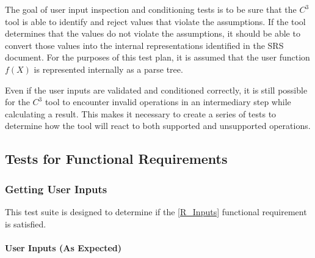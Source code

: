 \documentclass[12pt, titlepage]{article}
\newcommand{\prognameAbbrv}{$C^{3}$}
\begin{document}
The goal of user input inspection and conditioning tests is to be sure that the 
\prognameAbbrv{} tool is able to identify and reject values that violate the 
assumptions. If the tool determines that the values do not violate the 
assumptions, it should be able to convert those values into the internal 
representations identified in the SRS document. For the purposes of this test 
plan, it is assumed that the user function $f(X)$ is represented internally as 
a parse tree.

Even if the user inputs are validated and conditioned correctly, it is still 
possible for the \prognameAbbrv{} tool to encounter invalid operations in an 
intermediary step while calculating a result. This makes it necessary to create 
a series of tests to determine how the tool will react to both supported and 
unsupported operations.
	
\subsection{Tests for Functional Requirements}
\label{testplan_functional}

\subsubsection{Getting User Inputs}
This test suite is designed to determine if the \ref{R_Inputs} functional 
requirement is satisfied.

\paragraph{User Inputs (As Expected)}
\end{document}
